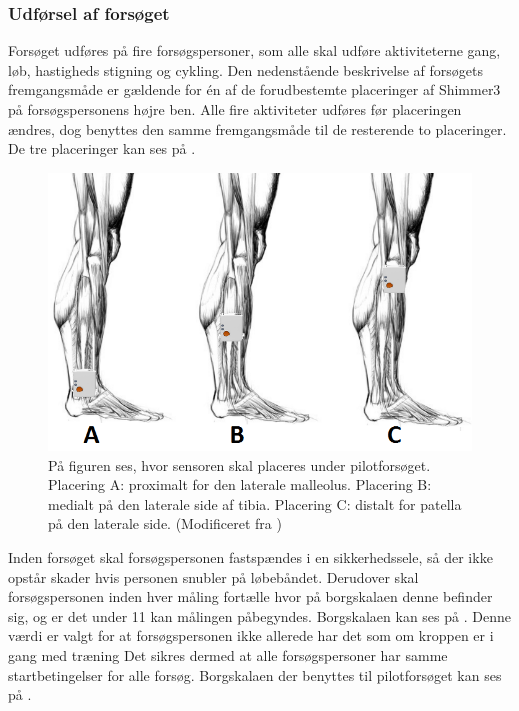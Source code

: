 \subsubsection{Udførsel af forsøget}
Forsøget udføres på fire forsøgspersoner, som alle skal udføre aktiviteterne gang, løb, hastigheds stigning og cykling. Den nedenstående beskrivelse af forsøgets fremgangsmåde er gældende for én af de forudbestemte placeringer af Shimmer3 på forsøgspersonens højre ben. Alle fire aktiviteter udføres før placeringen ændres, dog benyttes den samme fremgangsmåde til de resterende to placeringer. De tre placeringer kan ses på .

\begin{figure}[H]
	\centering
	\includegraphics[scale=0.6]{figures/qBilag/Sensor_placering2.png}
	\caption{På figuren ses, hvor sensoren skal placeres under pilotforsøget. Placering A: proximalt for den laterale malleolus. Placering B: medialt på den laterale side af tibia. Placering C: distalt for patella på den laterale side. (Modificeret fra \cite{Perna2016,Shimmer2016})}
	\label{fig:sensor_placering}
\end{figure}

Inden forsøget skal forsøgspersonen fastspændes i en sikkerhedssele, så der ikke opstår skader hvis personen snubler på løbebåndet. Derudover skal forsøgspersonen inden hver måling fortælle hvor på borgskalaen denne befinder sig, og er det under 11 kan målingen påbegyndes. Borgskalaen kan ses på . Denne værdi er valgt for at forsøgspersonen ikke allerede har det som om kroppen er i gang med træning Det sikres dermed at alle forsøgspersoner har samme startbetingelser for alle forsøg. Borgskalaen der benyttes til pilotforsøget kan ses på . 

